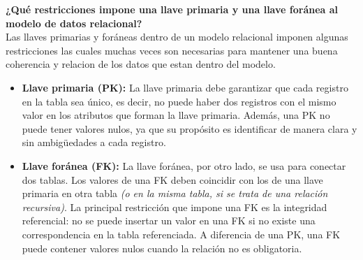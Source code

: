 \textbf{¿Qué restricciones impone una llave primaria y una llave foránea al modelo de datos relacional?}\vspace{.3cm} \\

Las llaves primarias y foráneas dentro de un modelo relacional imponen algunas restricciones las cuales muchas veces son necesarias para mantener una buena coherencia y relacion de los datos que estan dentro del modelo.

\begin{itemize}
    \item \textbf{Llave primaria (PK):} La llave primaria debe garantizar que cada registro en la tabla sea único, es decir, no puede haber dos registros con el mismo valor en los atributos que forman la llave primaria. Además, una PK no puede tener valores nulos, ya que su propósito es identificar de manera clara y sin ambigüedades a cada registro. \\
    
    \item \textbf{Llave foránea (FK):} La llave foránea, por otro lado, se usa para conectar dos tablas. Los valores de una FK deben coincidir con los de una llave primaria en otra tabla \textit{(o en la misma tabla, si se trata de una relación recursiva)}. La principal restricción que impone una FK es la integridad referencial: no se puede insertar un valor en una FK si no existe una correspondencia en la tabla referenciada. A diferencia de una PK, una FK puede contener valores nulos cuando la relación no es obligatoria. \\
\end{itemize}